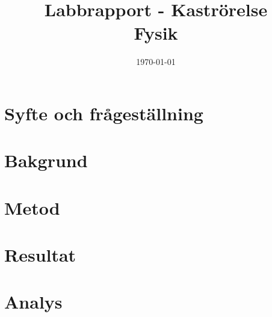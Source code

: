 \documentclass[11p]{article}
\title{Labbrapport - Kaströrelse \\ \small Fysik}
\author{\name}
\date{\today}
\begin{document}
    \maketitle


    \section{Syfte och frågeställning}
    
    \section{Bakgrund}
    
    \section{Metod}

    \section{Resultat}
    
    \section{Analys}

\end{document}
